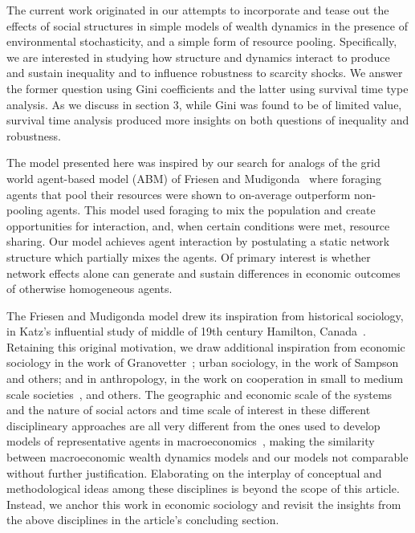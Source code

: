 \documentclass[sigconf]{acmart}
\begin{document}
The current work originated in our attempts to incorporate and tease out the effects of social structures in simple models of wealth dynamics in the presence of environmental stochasticity, and a simple form of resource pooling. Specifically, we are interested in studying how structure and dynamics interact to produce and sustain inequality and to influence robustness to scarcity shocks. We answer the former question using Gini coefficients and the latter using survival time type analysis. As we discuss in section 3, while Gini was found to be of limited value, survival time analysis produced more insights on both questions of inequality and robustness. 

The model presented here was inspired by our search for analogs of the grid world agent-based model (ABM) of Friesen and Mudigonda~\cite{srimil} where foraging agents that pool their resources were shown to on-average outperform non-pooling agents. This model used foraging to mix the population and create opportunities for interaction, and, when certain conditions were met, resource sharing. Our model achieves agent interaction by postulating a static network structure which partially mixes the agents. Of primary interest is whether network effects alone can generate and sustain differences in economic outcomes of otherwise homogeneous agents.  

The Friesen and Mudigonda model drew its inspiration from historical sociology, in Katz's influential study of middle of 19th century Hamilton, Canada~\cite{katz2013people}. Retaining this original motivation, we draw additional inspiration from economic sociology in the work of Granovetter~\cite{granovetter2005}; urban sociology, in the work of Sampson~\cite{sampson2002} and others; and in anthropology, in the work on cooperation in small to medium scale societies~\cite{avner1994,white2011kinship}, and others. The geographic and economic scale of the systems and the nature of social actors and time scale of interest in these different disciplineary approaches are all very different from the ones used to develop models of representative agents in macroeconomics~\cite{benhabib2018}, making the similarity between macroeconomic wealth dynamics models and our models not comparable without further justification. Elaborating on the interplay of conceptual and methodological ideas among these disciplines is beyond the scope of this article. Instead, we anchor this work in economic sociology and revisit the insights from the above disciplines in the article's concluding section.
\end{document}
